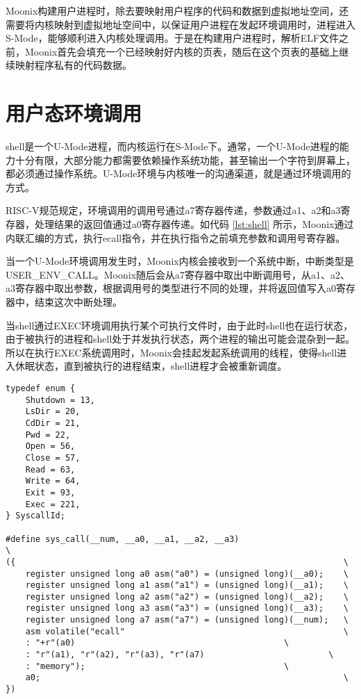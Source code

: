 Moonix构建用户进程时，除去要映射用户程序的代码和数据到虚拟地址空间，还需要将内核映射到虚拟地址空间中，以保证用户进程在发起环境调用时，进程进入S-Mode，能够顺利进入内核处理调用。于是在构建用户进程时，解析ELF文件之前，Moonix首先会填充一个已经映射好内核的页表，随后在这个页表的基础上继续映射程序私有的代码数据。

\section{用户态环境调用}

shell是一个U-Mode进程，而内核运行在S-Mode下。通常，一个U-Mode进程的能力十分有限，大部分能力都需要依赖操作系统功能，甚至输出一个字符到屏幕上，都必须通过操作系统。U-Mode环境与内核唯一的沟通渠道，就是通过环境调用的方式。

RISC-V规范规定，环境调用的调用号通过a7寄存器传递，参数通过a1、a2和a3寄存器，处理结果的返回值通过a0寄存器传递。如代码 \ref{lst:shell} 所示，Moonix通过内联汇编的方式，执行ecall指令，并在执行指令之前填充参数和调用号寄存器。

当一个U-Mode环境调用发生时，Moonix内核会接收到一个系统中断，中断类型是USER\_ENV\_CALL。Moonix随后会从a7寄存器中取出中断调用号，从a1、a2、a3寄存器中取出参数，根据调用号的类型进行不同的处理，并将返回值写入a0寄存器中，结束这次中断处理。

当shell通过EXEC环境调用执行某个可执行文件时，由于此时shell也在运行状态，由于被执行的进程和shell处于并发执行状态，两个进程的输出可能会混杂到一起。所以在执行EXEC系统调用时，Moonix会挂起发起系统调用的线程，使得shell进入休眠状态，直到被执行的进程结束，shell进程才会被重新调度。

\begin{minipage}[c]{0.95\textwidth}
\begin{lstlisting}[language={moonix}, caption={U-Mode环境调用}, label={lst:shell}]
typedef enum {
	Shutdown = 13,
	LsDir = 20,
	CdDir = 21,
	Pwd = 22,
	Open = 56,
	Close = 57,
	Read = 63,
	Write = 64,
	Exit = 93,
	Exec = 221,
} SyscallId;

#define sys_call(__num, __a0, __a1, __a2, __a3)                          \
({                                                                  \
	register unsigned long a0 asm("a0") = (unsigned long)(__a0);    \
	register unsigned long a1 asm("a1") = (unsigned long)(__a1);    \
	register unsigned long a2 asm("a2") = (unsigned long)(__a2);    \
	register unsigned long a3 asm("a3") = (unsigned long)(__a3);    \
	register unsigned long a7 asm("a7") = (unsigned long)(__num);   \
	asm volatile("ecall"                                            \
	: "+r"(a0)                                          \
	: "r"(a1), "r"(a2), "r"(a3), "r"(a7)                         \
	: "memory");                                        \
	a0;                                                             \
})
\end{lstlisting}
\end{minipage}
